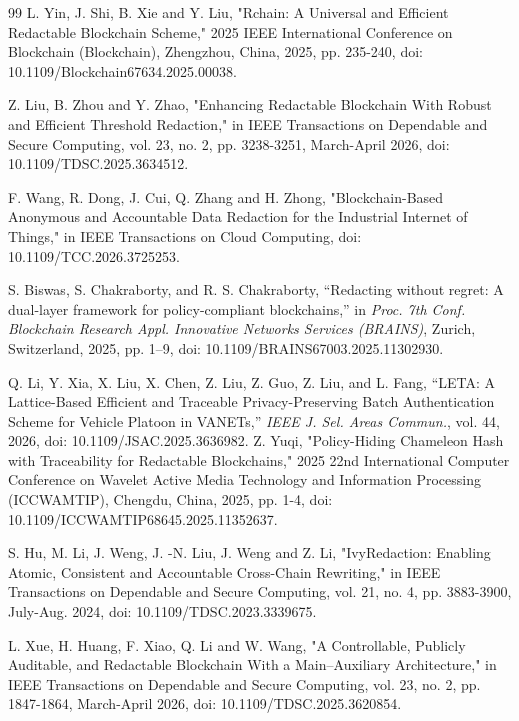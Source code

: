 \documentclass[lettersize,journal]{IEEEtran}
\begin{document}
\begin{thebibliography}{99}
    L. Yin, J. Shi, B. Xie and Y. Liu, "Rchain: A Universal and Efficient Redactable Blockchain Scheme," 2025 IEEE International Conference on Blockchain (Blockchain), Zhengzhou, China, 2025, pp. 235-240, doi: 10.1109/Blockchain67634.2025.00038.
    
    Z. Liu, B. Zhou and Y. Zhao, "Enhancing Redactable Blockchain With Robust and Efficient Threshold Redaction," in IEEE Transactions on Dependable and Secure Computing, vol. 23, no. 2, pp. 3238-3251, March-April 2026, doi: 10.1109/TDSC.2025.3634512.
    
    F. Wang, R. Dong, J. Cui, Q. Zhang and H. Zhong, "Blockchain-Based Anonymous and Accountable Data Redaction for the Industrial Internet of Things," in IEEE Transactions on Cloud Computing, doi: 10.1109/TCC.2026.3725253.
    
    S. Biswas, S. Chakraborty, and R. S. Chakraborty,
    ``Redacting without regret: A dual-layer framework for
    policy-compliant blockchains,''
    in \textit{Proc. 7th Conf. Blockchain Research Appl. Innovative
    Networks Services (BRAINS)}, Zurich, Switzerland, 2025,
    pp. 1--9, doi: 10.1109/BRAINS67003.2025.11302930.
    
    \textcolor{e2}{Q. Li, Y. Xia, X. Liu, X. Chen, Z. Liu, Z. Guo, Z. Liu, and L. Fang, ``LETA: A Lattice-Based Efficient and Traceable Privacy-Preserving Batch Authentication Scheme for Vehicle Platoon in VANETs,'' \textit{IEEE J. Sel. Areas Commun.}, vol. 44, 2026, doi: 10.1109/JSAC.2025.3636982.}    
    Z. Yuqi, "Policy-Hiding Chameleon Hash with Traceability for Redactable Blockchains," 2025 22nd International Computer Conference on Wavelet Active Media Technology and Information Processing (ICCWAMTIP), Chengdu, China, 2025, pp. 1-4, doi: 10.1109/ICCWAMTIP68645.2025.11352637.
    
    S. Hu, M. Li, J. Weng, J. -N. Liu, J. Weng and Z. Li, "IvyRedaction: Enabling Atomic, Consistent and Accountable Cross-Chain Rewriting," in IEEE Transactions on Dependable and Secure Computing, vol. 21, no. 4, pp. 3883-3900, July-Aug. 2024, doi: 10.1109/TDSC.2023.3339675.
    
    L. Xue, H. Huang, F. Xiao, Q. Li and W. Wang, "A Controllable, Publicly Auditable, and Redactable Blockchain With a Main–Auxiliary Architecture," in IEEE Transactions on Dependable and Secure Computing, vol. 23, no. 2, pp. 1847-1864, March-April 2026, doi: 10.1109/TDSC.2025.3620854.
    

\end{thebibliography}
\end{document}
